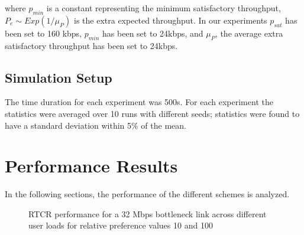 \documentclass[conference]{../../IEEEtran}
\begin{document}
where $p_{min}$ is a constant representing the minimum satisfactory throughput, $P_e \sim Exp(1/\mu_P)$ is the extra expected throughput. In our experiments $p_{sat}$ has been set to 160 kbps, $p_{min}$ has been set to 24kbps, and $\mu_P$, the average extra satisfactory throughput has been set to 24kbps.
	
\subsection{Simulation Setup}

The time duration for each experiment was 500s. For each experiment the statistics were averaged over 10 runs with different seeds; statistics were found to have a standard deviation within 5\% of the mean.

\section{Performance Results}
\label{sec:exp}

In the following sections, the performance of the different schemes is analyzed. 

	\begin{figure}[hbt]
		\begin{center}
		\caption{RTCR performance for a 32 Mbps bottleneck link across different user loads for relative preference values 10 and 100}
		\label{fig:htcrrp}
		\end{center}
	\end{figure}	
	
\end{document}
